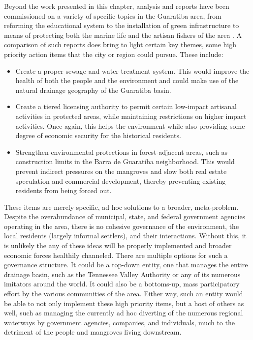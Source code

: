 Beyond the work presented in this chapter, analysis and reports have been commissioned on a variety of specific topics in the Guaratiba area, from reforming the educational system \cite{pizzolatoLOCALIZACAOESCOLASPUBLICAS2013} to the installation of green infrastructure \cite{herzogGuaratibaVerdeSubsidios2009} to means of protecting both the marine life and the artisan fishers of the area \cite{lopesTerritorialidadesEmConflitos2013}. A comparison of such reports does bring to light certain key themes, some high priority action items that the city or region could pursue. These include:

\begin{itemize}[itemsep=0pt,parsep=0pt]
	\item{Create a proper sewage and water treatment system. This would improve the health of both the people and the environment and could make use of the natural drainage geography of the Guaratiba basin.}
	\item{Create a tiered licensing authority to permit certain low-impact artisanal activities in protected areas, while maintaining restrictions on higher impact activities. Once again, this helps the environment while also providing some degree of economic security for the historical residents.}
	\item{Strengthen environmental protections in forest-adjacent areas, such as construction limits in the Barra de Guaratiba neighborhood. This would prevent indirect pressures on the mangroves and slow both real estate speculation and commercial development, thereby preventing existing residents from being forced out.}
\end{itemize}

These items are merely specific, ad hoc solutions to a broader, meta-problem. Despite the overabundance of municipal, state, and federal government agencies operating in the area, there is no cohesive governance of the environment, the local residents (largely informal settlers), and their interactions. Without this, it is unlikely the any of these ideas will be properly implemented and broader economic forces healthily channeled. There are multiple options for such a governance structure. It could be a top-down entity, one that manages the entire drainage basin, such as the Tennessee Valley Authority or any of its numerous imitators around the world. It could also be a bottoms-up, mass participatory effort by the various communities of the area. Either way, such an entity would be able to not only implement these high priority items, but a host of others as well, such as managing the currently ad hoc diverting of the numerous regional waterways by government agencies, companies, and individuals, much to the detriment of the people and mangroves living downstream.

